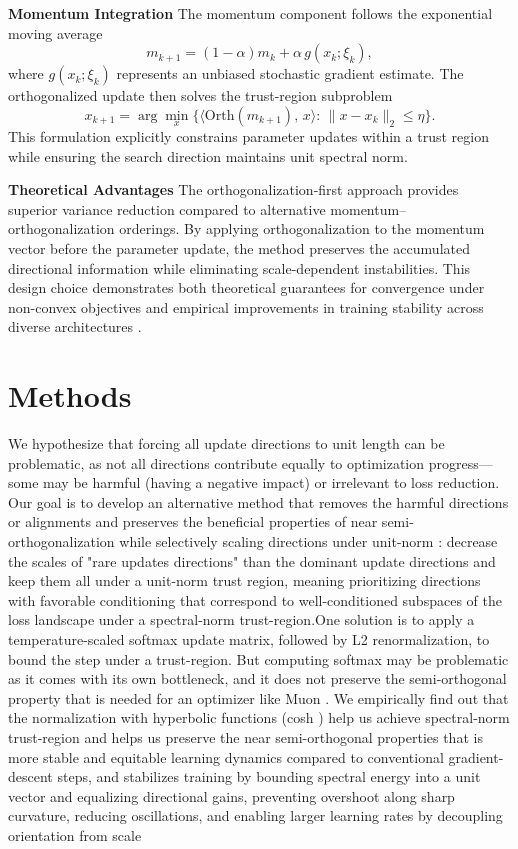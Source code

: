 \documentclass[12pt,a4paper]{article}
\begin{document}
\textbf{Momentum Integration}
The momentum component follows the exponential moving average
\[
m_{k+1} = (1-\alpha)m_k + \alpha \, g(x_k;\xi_k),
\]
where $g(x_k;\xi_k)$ represents an unbiased stochastic gradient estimate. The orthogonalized update then solves the trust-region subproblem
\[
x_{k+1} 
= \arg\min_{x} 
\Big\{ \langle \mathrm{Orth}(m_{k+1}), \, x \rangle 
: \, \|x - x_k\|_2 \leq \eta \Big\}.
\]
This formulation explicitly constrains parameter updates within a trust region while ensuring the search direction maintains unit spectral norm.

\textbf{Theoretical Advantages}
The orthogonalization-first approach provides superior variance reduction compared to alternative momentum--orthogonalization orderings. By applying orthogonalization to the momentum vector before the parameter update, the method preserves the accumulated directional information while eliminating scale-dependent instabilities. This design choice demonstrates both theoretical guarantees for convergence under non-convex objectives and empirical improvements in training stability across diverse architectures \parencite{liu2025muonscalablellmtraining}.

\section{Methods}
We hypothesize that forcing all update directions to unit length can be problematic, as not all directions contribute equally to optimization progress—some may be harmful (having a negative impact) or irrelevant to loss reduction. Our goal is to develop an alternative method that removes the harmful directions or alignments and  preserves the beneficial properties of near semi-orthogonalization while selectively scaling directions under unit-norm : decrease the  scales  of  "rare updates directions" than the dominant update directions and keep them all under a unit-norm trust region, meaning prioritizing directions with favorable conditioning that correspond to well-conditioned subspaces of the loss landscape under a spectral-norm trust-region.One solution is to apply a temperature-scaled softmax update matrix, followed by L2 renormalization, to bound the step under a trust-region. But computing softmax may be problematic as it comes with its own bottleneck, and it does not preserve the semi-orthogonal property that is needed for an optimizer like Muon .
We empirically find out that the  normalization with hyperbolic functions (cosh ) help us achieve spectral-norm trust-region \parencite{kovalev2025understandinggradientorthogonalizationdeep} and helps us preserve the near semi-orthogonal properties that is more stable and equitable learning dynamics compared to conventional gradient-descent steps, and stabilizes training by bounding spectral  energy into a unit vector and equalizing directional gains, preventing overshoot along sharp curvature, reducing oscillations, and
enabling larger learning rates by decoupling orientation from scale\parencite{Peletier_2023}
\end{document}
